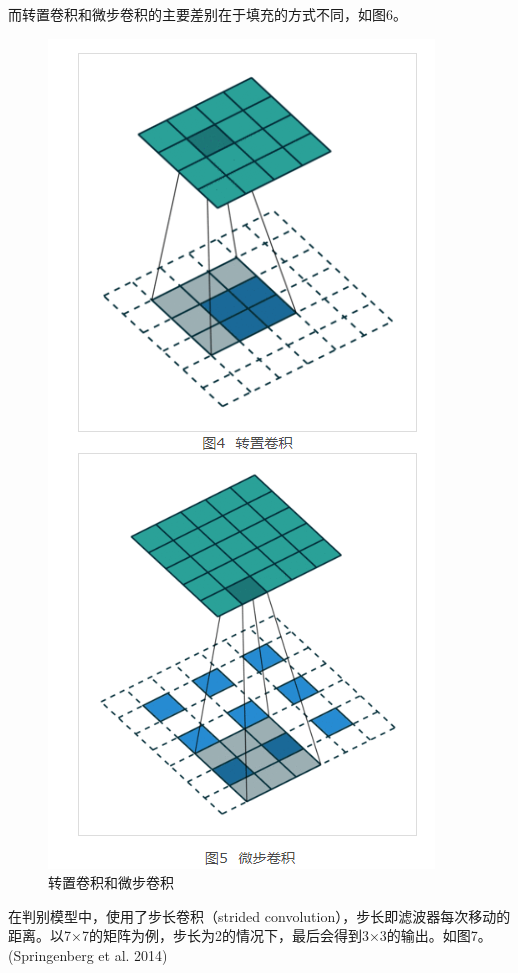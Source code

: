 \documentclass[hyperref, a4paper]{ctexart}
\begin{document}
而转置卷积和微步卷积的主要差别在于填充的方式不同，如图6。

\begin{figure}
\centering
\includegraphics{./6.png}
\caption{转置卷积和微步卷积}
\end{figure}

在判别模型中，使用了步长卷积（strided
convolution），步长即滤波器每次移动的距离。以7×7的矩阵为例，步长为2的情况下，最后会得到3×3的输出。如图7。(Springenberg
et al. 2014)
\end{document}
